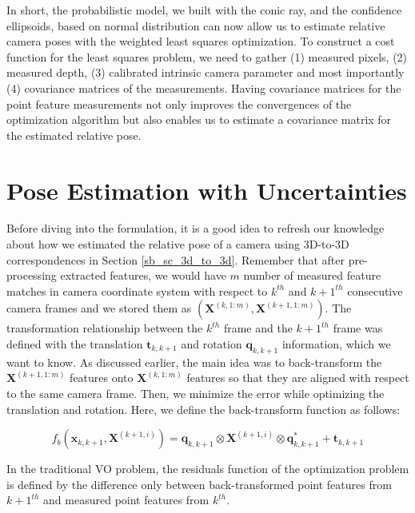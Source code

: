 \documentclass[a4paper]{report}
\numberwithin{figure}{section}
\begin{document}
In short, the probabilistic model, we built with the conic ray, and the
confidence ellipsoids, based on normal distribution can now allow us to
estimate relative camera poses with the weighted least squares optimization.
To construct a cost function for the least squares problem, we need to gather
(1) measured pixels, (2) measured depth, (3) calibrated intrinsic camera
parameter and most importantly (4) covariance matrices of the measurements.
Having covariance matrices for the point feature measurements not only improves
the convergences of the optimization algorithm but also enables us to estimate
a covariance matrix for the estimated relative pose. 



\section{Pose Estimation with Uncertainties} \label{sc_rel_pose_est_w_uncertainty}

Before diving into the formulation, it is a good idea to refresh our knowledge
about how we estimated the relative pose of a camera using 3D-to-3D 
correspondences
in Section \ref{sb_sc_3d_to_3d}.  Remember that after pre-processing extracted
features, we would have $m$ number of measured feature matches in camera
coordinate system with respect to $k^{th}$ and $k+1^{th}$ consecutive camera
frames and we stored them as $(\mathbf{X}^{(k,1:m)},
\mathbf{X}^{(k+1,1:m)})$. 
The transformation relationship between the $k^{th}$ frame
and the $k+1^{th}$ frame was defined with the translation $\mathbf{t}_{k,k+1}$
and rotation $\mathbf{q}_{k,k+1}$ information, which we want to know.  As
discussed earlier, the main idea was to back-transform the
$\mathbf{X}^{(k+1,1:m)}$ features onto $\mathbf{X}^{(k,1:m)}$ features so
that they are aligned with respect to the same camera frame.  Then, we minimize
the error while optimizing the translation and rotation.  Here, we define the
back-transform function as follows:

\begin{equation} f_b(\mathbf{x}_{k,k+1}, \mathbf{X}^{(k+1,i)}) =
\mathbf{q}_{k,k+1} \otimes \mathbf{X}^{(k+1,i)} \otimes \mathbf{q}_{k,k+1}^*
+ \mathbf{t}_{k,k+1} \end{equation}

In the traditional VO problem, the residuals function of the optimization
problem is defined by the difference only between back-transformed point
features from $k+1^{th}$ and measured point features from $k^{th}$.
\end{document}
